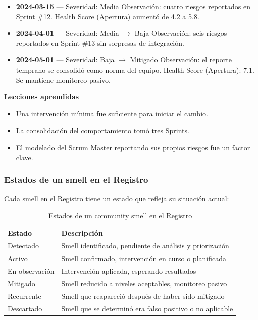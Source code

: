 \begin{protocolo}
\begin{itemize}
        \item \textbf{2024-03-15} — Severidad: Media
              Observación: cuatro riesgos reportados en Sprint \#12.
              Health Score (Apertura) aumentó de 4.2 a 5.8.

        \item \textbf{2024-04-01} — Severidad: Media $\rightarrow$ Baja
              Observación: seis riesgos reportados en Sprint \#13 sin sorpresas de integración.

        \item \textbf{2024-05-01} — Severidad: Baja $\rightarrow$ Mitigado
              Observación: el reporte temprano se consolidó como norma del equipo.
              Health Score (Apertura): 7.1.
              Se mantiene monitoreo pasivo.
    \end{itemize}

    \textbf{Lecciones aprendidas}
    \begin{itemize}
        \item Una intervención mínima fue suficiente para iniciar el cambio.
        \item La consolidación del comportamiento tomó tres Sprints.
        \item El modelado del Scrum Master reportando sus propios riesgos fue un factor clave.
    \end{itemize}

\end{protocolo}

\subsubsection{Estados de un smell en el Registro}

Cada smell en el Registro tiene un estado que refleja su situación actual:

\begin{table}[h]
    \centering
    \small
    \begin{tabularx}{\textwidth}{|l|X|}
        \hline
        \textbf{Estado} & \textbf{Descripción}                                     \\
        \hline
        Detectado       & Smell identificado, pendiente de análisis y priorización \\
        \hline
        Activo          & Smell confirmado, intervención en curso o planificada    \\
        \hline
        En observación  & Intervención aplicada, esperando resultados              \\
        \hline
        Mitigado        & Smell reducido a niveles aceptables, monitoreo pasivo    \\
        \hline
        Recurrente      & Smell que reapareció después de haber sido mitigado      \\
        \hline
        Descartado      & Smell que se determinó era falso positivo o no aplicable \\
        \hline
    \end{tabularx}
    \caption{Estados de un community smell en el Registro}
    \label{tab:estados-smell}
\end{table}

